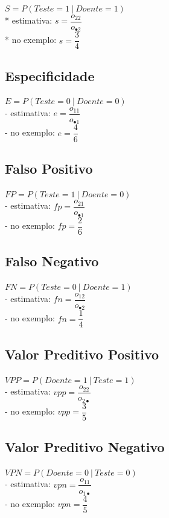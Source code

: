 \documentclass[
]{book}
\begin{document}
\(S = P(Teste = 1 ~|~ Doente = 1)\)\\
* estimativa: \(s = \dfrac{o_{22}}{o_{\bullet 2}}\)\\
* no exemplo: \(s = \dfrac{3}{4}\)

\subsection{Especificidade}\label{especificidade}

\(E = P(Teste = 0 ~|~ Doente = 0)\)\\
- estimativa: \(e = \dfrac{o_{11}}{o_{\bullet 1}}\)\\
- no exemplo: \(e = \dfrac{4}{6}\)

\subsection{Falso Positivo}\label{falso-positivo}

\(FP = P(Teste = 1 ~|~ Doente = 0)\)\\
- estimativa: \(fp = \dfrac{o_{21}}{o_{\bullet 1}}\)\\
- no exemplo: \(fp = \dfrac{2}{6}\)

\subsection{Falso Negativo}\label{falso-negativo}

\(FN = P(Teste = 0 ~|~ Doente = 1)\)\\
- estimativa: \(fn = \dfrac{o_{12}}{o_{\bullet 2}}\)\\
- no exemplo: \(fn = \dfrac{1}{4}\)

\subsection{Valor Preditivo Positivo}\label{valor-preditivo-positivo}

\(VPP=P(Doente=1~|~Teste=1)\)\\
- estimativa: \(vpp = \dfrac{o_{22}}{o_{2 \bullet}}\)\\
- no exemplo: \(vpp = \dfrac{3}{5}\)

\subsection{Valor Preditivo Negativo}\label{valor-preditivo-negativo}

\(VPN = P(Doente=0~|~Teste=0)\)\\
- estimativa: \(vpn = \dfrac{o_{11}}{o_{1 \bullet}}\)\\
- no exemplo: \(vpn = \dfrac{4}{5}\)
\end{document}
